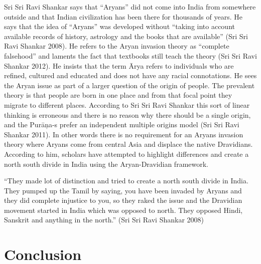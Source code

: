 Sri Sri Ravi Shankar says that “Aryans” did not come into India from somewhere outside and that Indian civilization has been there for thousands of years. He says that the idea of “Aryans” was developed without “taking into account available records of history, astrology and the books that are available” (Sri Sri Ravi Shankar 2008). He refers to the Aryan invasion theory as “complete falsehood” and laments the fact that textbooks still teach the theory (Sri Sri Ravi Shankar 2012). He insists that the term Ārya refers to individuals who are refined, cultured and educated and does not have any racial connotations. He sees the Aryan issue as part of a larger question of the origin of people. The prevalent theory is that people are born in one place and from that focal point they migrate to different places. According to Sri Sri Ravi Shankar this sort of linear thinking is erroneous and there is no reason why there should be a single origin, and the Purāņa-s prefer an independent multiple origins model (Sri Sri Ravi Shankar 2011). In other words there is no requirement for an Aryans invasion theory where Aryans come from central Asia and displace the native Dravidians. According to him, scholars have attempted to highlight differences and create a north south divide in India using the Aryan-Dravidian framework.

\begin{myquote}
“They made lot of distinction and tried to create a north south divide in India. They pumped up the Tamil by saying, you have been invaded by Aryans and they did complete injustice to you, so they raked the issue and the Dravidian movement started in India which was opposed to north. They opposed Hindi, Sanskrit and anything in the north.” (Sri Sri Ravi Shankar 2008)
\end{myquote}


\section*{Conclusion}

